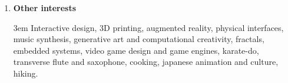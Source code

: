\documentclass[letterpaper,11pt]{article}
\newcommand{\compactlist}{\setlength{\parskip}{0pt} \setlength{\leftskip}{2em}}
\begin{document}
\begin{enumerate}[I]
		
	\item \textbf{Other interests} 
	
	{\leftskip 3em Interactive design, 3D printing, augmented reality, physical interfaces, music synthesis, generative art and computational creativity,  fractals, embedded systems, video game design and game engines, karate-do, transverse flute and saxophone, cooking, japanese animation and culture, hiking.  \par }

	
\end{enumerate}
\end{document}
